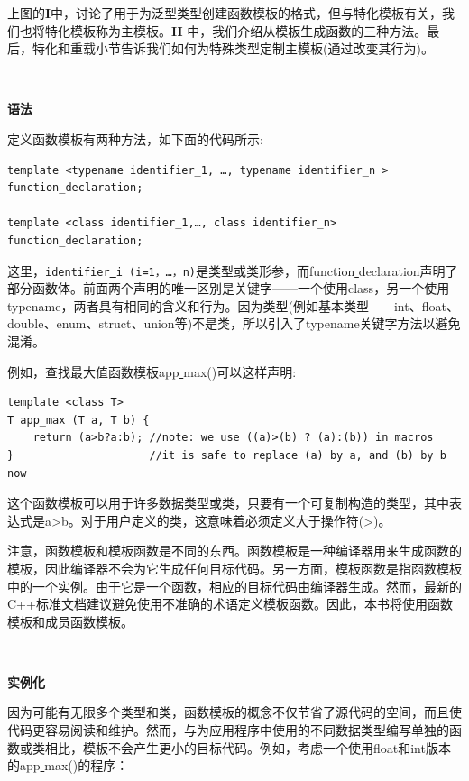 上图的\textbf{I}中，讨论了用于为泛型类型创建函数模板的格式，但与特化模板有关，我们也将特化模板称为主模板。\textbf{II }中，我们介绍从模板生成函数的三种方法。最后，特化和重载小节告诉我们如何为特殊类型定制主模板(通过改变其行为)。 \par

\noindent\textbf{}\ \par
\textbf{语法} \ \par
定义函数模板有两种方法，如下面的代码所示: \par

\begin{lstlisting}[caption={}]
template <typename identifier_1, …, typename identifier_n >
function_declaration;

template <class identifier_1,…, class identifier_n>
function_declaration;
\end{lstlisting}

这里，\texttt{identifier\underline{ }i (i=1，…，n)}是类型或类形参，而function\underline{ }declaration声明了部分函数体。前面两个声明的唯一区别是关键字——一个使用class，另一个使用typename，两者具有相同的含义和行为。因为类型(例如基本类型——int、float、double、enum、struct、union等)不是类，所以引入了typename关键字方法以避免混淆。 \par
例如，查找最大值函数模板app\underline{ }max()可以这样声明: \par

\begin{lstlisting}[caption={}]
template <class T>
T app_max (T a, T b) {
	return (a>b?a:b); //note: we use ((a)>(b) ? (a):(b)) in macros
}                     //it is safe to replace (a) by a, and (b) by b now
\end{lstlisting}

这个函数模板可以用于许多数据类型或类，只要有一个可复制构造的类型，其中表达式是a>b。对于用户定义的类，这意味着必须定义大于操作符(>)。 \par
注意，函数模板和模板函数是不同的东西。函数模板是一种编译器用来生成函数的模板，因此编译器不会为它生成任何目标代码。另一方面，模板函数是指函数模板中的一个实例。由于它是一个函数，相应的目标代码由编译器生成。然而，最新的C++标准文档建议避免使用不准确的术语定义模板函数。因此，本书将使用函数模板和成员函数模板。 \par

\noindent\textbf{}\ \par
\textbf{实例化} \ \par
因为可能有无限多个类型和类，函数模板的概念不仅节省了源代码的空间，而且使代码更容易阅读和维护。然而，与为应用程序中使用的不同数据类型编写单独的函数或类相比，模板不会产生更小的目标代码。例如，考虑一个使用float和int版本的app\underline{ }max()的程序： \par

